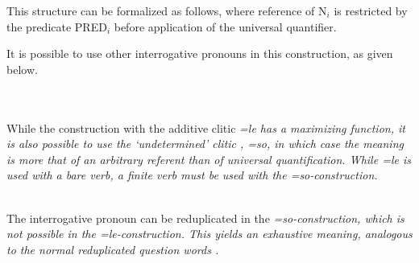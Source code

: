 
This structure can be formalized as follows, where reference of N$_i$ is restricted by the predicate PRED$_i$ before application of the universal quantifier.


It is possible to use other interrogative pronouns in this construction, as given below.




 \\

 \\

While the construction with the additive clitic \em =le \em has a maximizing function, it is also possible to use the `undetermined' clitic \em, =so\em, in which case the meaning is more that of an arbitrary referent than of universal quantification. While \em =le \em is used with a bare verb, a finite verb must be used with the \em =so\em-construction.


 \\
The interrogative pronoun can be reduplicated in the \em =so\em-construction, which is not possible in the \em =le\em-construction. This yields an exhaustive meaning, analogous to the normal reduplicated question words .



